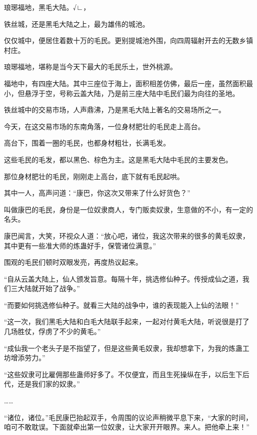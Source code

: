 
\begin{this_body}

琅琊福地，黑毛大陆。√∟，

铁丝城，还是黑毛大陆之上，最为雄伟的城池。

仅仅城中，便居住着数十万的毛民。更别提城池外围，向四周辐射开去的无数乡镇村庄。

琅琊福地，堪称是当今天下最大的毛民乐土，世外桃源。

福地中，有四座大陆。其中三座位于海上，面积相差仿佛，最后一座，虽然面积最小，但悬浮于空，号称云盖大陆，乃是前三座大陆中毛民们最为向往的圣地。

铁丝城中的交易市场，人声鼎沸，乃是黑毛大陆上著名的交易场所之一。

今天，在这交易市场的东南角落，一位身材肥壮的毛民走上高台。

高台下，围着一圈的毛民，也都身材粗壮，长满毛发。

这些毛民的毛发，都以黑色、棕色为主。这是黑毛大陆中毛民的主要发色。

那位身材肥壮的毛民，刚刚走上高台，底下就有毛民起哄。

其中一人，高声问道：“康巴，你这次又带来了什么好货色？”

叫做康巴的毛民，身份是一位奴隶商人，专门贩卖奴隶，生意做的不小，有一定的名头。

康巴闻言，大笑，环视众人道：“放心吧，诸位，我这次带来的很多的黄毛奴隶，其中更有一些准大师的炼蛊好手，保管诸位满意。”

围观的毛民们顿时双眼发亮，再度热议起来。

“自从云盖大陆上，仙人颁发旨意。每隔十年，挑选修仙种子。传授成仙之道，我们三大陆就开始了战争。”

“而要如何挑选修仙种子。就看三大陆的战争中，谁的表现能入上仙的法眼！”

“这一次，我们黑毛大陆和白毛大陆联手起来，一起对付黄毛大陆，听说很是打了几场胜仗，俘虏了不少的黄毛。”

“成仙我一个老头子是不指望了，但是这些黄毛奴隶，我却想拿下，为我的炼蛊工坊增添劳力。”

“这些奴隶可比雇佣那些蛊师好多了。不仅便宜，而且生死操纵在手，以后生下后代，还是我们家的奴隶。”

……

“诸位，诸位。”毛民康巴抬起双手，令周围的议论声稍微平息下来，“大家的时间，咱可不敢耽误。下面就牵出第一位奴隶，让大家开开眼界。来人。把他牵上来！”


\end{this_body}
